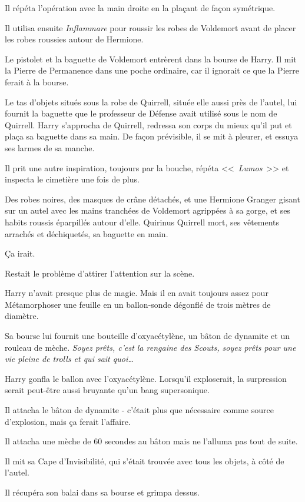 Il répéta l'opération avec la main droite en la plaçant de façon symétrique.

Il utilisa ensuite \emph{Inflammare} pour roussir les robes de Voldemort avant de placer les robes roussies autour de Hermione.

Le pistolet et la baguette de Voldemort entrèrent dans la bourse de Harry. Il mit la Pierre de Permanence dans une poche ordinaire, car il ignorait ce que la Pierre ferait à la bourse.

Le tas d'objets situés sous la robe de Quirrell, située elle aussi près de l'autel, lui fournit la baguette que le professeur de Défense avait utilisé sous le nom de Quirrell. Harry s'approcha de Quirrell, redressa son corps du mieux qu'il put et plaça sa baguette dans sa main. De façon prévisible, il se mit à pleurer, et essuya ses larmes de sa manche.

Il prit une autre inspiration, toujours par la bouche, répéta <<~\emph{Lumos}~>> et inspecta le cimetière une fois de plus.

Des robes noires, des masques de crâne détachés, et une Hermione Granger gisant sur un autel avec les mains tranchées de Voldemort agrippées à sa gorge, et ses habits roussis éparpillés autour d'elle. Quirinus Quirrell mort, ses vêtements arrachés et déchiquetés, sa baguette en main.

Ça irait.

Restait le problème d'attirer l'attention sur la scène.

Harry n'avait presque plus de magie. Mais il en avait toujours assez pour Métamorphoser une feuille en un ballon-sonde dégonflé de trois mètres de diamètre.

Sa bourse lui fournit une bouteille d'oxyacétylène, un bâton de dynamite et un rouleau de mèche. \emph{Soyez prêts, c'est la rengaine des Scouts, soyez prêts pour une vie pleine de trolls et qui sait quoi…}

Harry gonfla le ballon avec l'oxyacétylène. Lorsqu'il exploserait, la surpression serait peut-être aussi bruyante qu'un bang supersonique.

Il attacha le bâton de dynamite - c'était plus que nécessaire comme source d'explosion, mais ça ferait l'affaire.

Il attacha une mèche de 60 secondes au bâton mais ne l'alluma pas tout de suite.

Il mit sa Cape d'Invisibilité, qui s'était trouvée avec tous les objets, à côté de l'autel.

Il récupéra son balai dans sa bourse et grimpa dessus.

